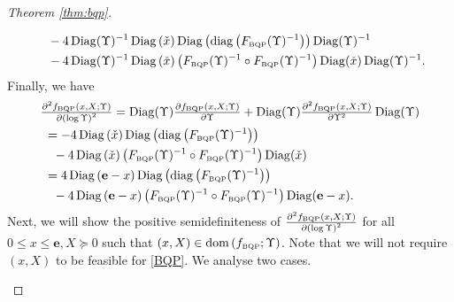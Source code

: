 \documentclass[smallextended]{svjour3hack}       %
\DeclareMathOperator{\Diag}{Diag}
\DeclareMathOperator{\diag}{diag}
\DeclareMathOperator{\dom}{dom}
\begin{document}
\begin{proof}[Theorem \ref{thm:bqp}]
\begin{itemize}
\begin{align*}
        &\quad -4 \Diag(\Upsilon)^{-1} \Diag\left(\check{x}\right) \Diag\left(\diag\left(F_{{\tiny\mbox{BQP}}}(\Upsilon)^{-1}\right)\right) \Diag(\Upsilon)^{-1} \\
        &\quad -4 \Diag(\Upsilon)^{-1} \Diag\left(\check{x}\right)   \left(F_{{\tiny\mbox{BQP}}}(\Upsilon)^{-1}\circ F_{{\tiny\mbox{BQP}}}(\Upsilon)^{-1}\right)\Diag(\check{x}) \Diag(\Upsilon)^{-1}.
    \end{align*}
   Finally, we have
    \begin{align*}
        &\textstyle\frac{\partial^2 f_{{\tiny\mbox{BQP}}}\left(x,X;\Upsilon\right)}{\partial \left(\log \Upsilon\right) ^2} =\Diag(\Upsilon) \textstyle\frac{\partial f_{{\tiny\mbox{BQP}}}\left(x,X;\Upsilon\right)}{\partial \Upsilon } + \Diag(\Upsilon)\frac{\partial^2 f_{{\tiny\mbox{BQP}}}\left(x,X;\Upsilon\right)}{\partial \Upsilon ^2 } \Diag(\Upsilon)\\
        & ~= -4 \Diag\left(\check{x}\right) \Diag\left(\diag\left(F_{{\tiny\mbox{BQP}}}(\Upsilon)^{-1}\right)\right) \\
        &\quad - 4  \Diag\left(\check{x}\right)   \left(F_{{\tiny\mbox{BQP}}}(\Upsilon)^{-1}\circ F_{{\tiny\mbox{BQP}}}(\Upsilon)^{-1}\right) \Diag(\check{x})\\
        &~ =4 \Diag\left(\mathbf{e}-x\right) \Diag\left(\diag\left(F_{{\tiny\mbox{BQP}}}(\Upsilon)^{-1}\right)\right) \\
        &\quad -4  \Diag\left(\mathbf{e}-x\right)   \left(F_{{\tiny\mbox{BQP}}}(\Upsilon)^{-1}\circ F_{{\tiny\mbox{BQP}}}(\Upsilon)^{-1}\right) \Diag(\mathbf{e}-x).
    \end{align*}
\smallskip
    Next, we will show the positive semidefiniteness of $\frac{\partial^2 f_{{\tiny\mbox{BQP}}}\left(x,X;\Upsilon\right)}{\partial \left(\log \Upsilon\right) ^2} $ for all $ 0\le x \le \mathbf{e}, X \succeq 0$ such that $(x,X) \in \dom\left(f_{{\tiny\mbox{BQP}}};\Upsilon\right)$. Note that we will not require $(x,X)$ to be feasible for \ref{BQP}. We analyse  two cases.


\end{itemize}
\end{proof}
\end{document}
